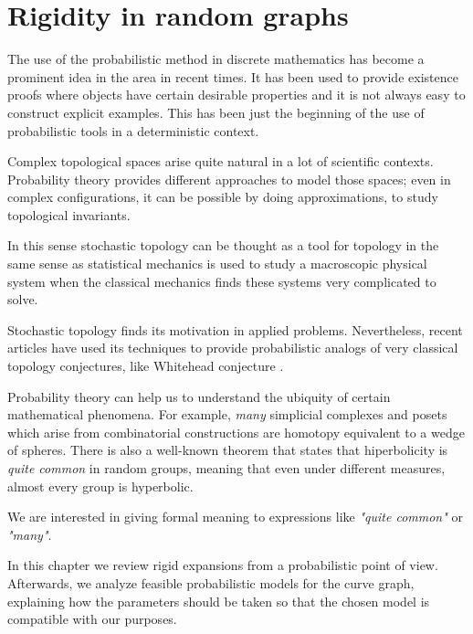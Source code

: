 
\chapter{Rigidity in random graphs} %

\label{Chapter2} %



The use of the probabilistic method in discrete mathematics has become a prominent idea in the area in recent times. It has been used to provide existence proofs where objects have certain desirable properties and it is not always easy to construct explicit examples. This has been just the beginning of the use of probabilistic tools in a deterministic context.

Complex topological spaces arise quite natural in a lot of scientific contexts. Probability theory provides different approaches to model those spaces; even in complex configurations, it can be possible by doing approximations, to study topological invariants. 

In this sense stochastic topology can be thought as a tool for topology in the same sense as statistical mechanics is used to study a macroscopic physical system when the classical mechanics finds these systems very complicated to solve.

Stochastic topology finds its motivation in applied problems. Nevertheless, recent articles have used its techniques to provide probabilistic analogs of very classical topology conjectures, like Whitehead conjecture \cite{Costa15}.

Probability theory can help us to understand the ubiquity of certain mathematical phenomena. For example, \textit{many} simplicial complexes and posets which arise from combinatorial constructions are homotopy equivalent to a wedge of spheres. There is also a well-known theorem that states that hiperbolicity is \textit{quite common} in random groups, meaning that even under different measures, almost every group is hyperbolic.

We are interested in giving formal meaning to expressions like \textit{"quite common"} or \textit{"many"}.

In this chapter we review rigid expansions from a probabilistic point of view. Afterwards, we analyze feasible probabilistic models for the curve graph, explaining how the parameters should be taken so that the chosen model is compatible with our purposes.

